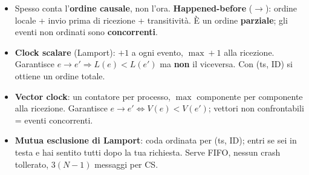 \begin{itemize}
\tightlist
\item
  Spesso conta l'\textbf{ordine causale}, non l'ora. \textbf{Happened-before} (\(\to\)): ordine locale + invio prima di ricezione + transitività. È un ordine \textbf{parziale}; gli eventi non ordinati sono \textbf{concorrenti}.
\item
  \textbf{Clock scalare} (Lamport): \(+1\) a ogni evento, \(\max + 1\) alla ricezione. Garantisce \(e \to e' \Rightarrow L(e) < L(e')\) ma \textbf{non} il viceversa. Con (ts, ID) si ottiene un ordine totale.
\item
  \textbf{Vector clock}: un contatore per processo, \(\max\) componente per componente alla ricezione. Garantisce \(e \to e' \iff V(e) < V(e')\); vettori non confrontabili = eventi concorrenti.
\item
  \textbf{Mutua esclusione di Lamport}: coda ordinata per (ts, ID); entri se sei in testa e hai sentito tutti dopo la tua richiesta. Serve FIFO, nessun crash tollerato, \(3(N-1)\) messaggi per CS.
\end{itemize}
